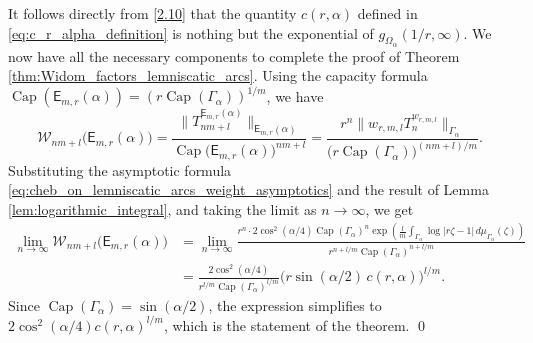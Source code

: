 \documentclass[12pt,oneside,reqno]{amsart}
\theoremstyle{definition}
\numberwithin{equation}{section}
\newcommand{\E}{{\mathsf E}}
\newcommand{\cW}{{\mathcal{W}}}
\renewcommand{\Cap}{\operatorname{Cap}}
\begin{document}
It follows directly from \eqref{2.10} that the quantity $c(r,\alpha)$ defined in \eqref{eq:c_r_alpha_definition} is nothing but the exponential of $g_{\Omega_\alpha}(1/r, \infty)$. 
We now have all the necessary components to complete the proof of Theorem \ref{thm:Widom_factors_lemniscatic_arcs}.
Using the capacity formula $\Cap(\E_{m,r}(\alpha)) = (r\Cap(\Gamma_\alpha))^{1/m}$, we have
\[
	\cW_{nm+l}\bigl(\E_{m,r}(\alpha)\bigr) = 
	\frac{\|T_{nm+l}^{\E_{m,r}(\alpha)}\|_{\E_{m,r}(\alpha)}}{\Cap\bigl(\E_{m,r}(\alpha)\bigr)^{nm+l}} = 
	\frac{r^n\|w_{r,m,l}T_{n}^{w_{r,m,l}}\|_{\Gamma_\alpha}}{\bigl(r\Cap(\Gamma_\alpha)\bigr)^{(nm+l)/m}}.
\]
Substituting the asymptotic formula \eqref{eq:cheb_on_lemniscatic_arcs_weight_asymptotics} and the result of Lemma \ref{lem:logarithmic_integral}, and taking the limit as $n\to\infty$, we get
\begin{align*}
\lim_{n\to\infty} \cW_{nm+l}\bigl(\E_{m,r}(\alpha)\bigr) &= \lim_{n\to\infty} \frac{r^n \cdot 2\cos^2(\alpha/4)\Cap(\Gamma_\alpha)^n \exp\left(\frac{l}{m}\int_{\Gamma_\alpha}\log|r\zeta-1|\,d\mu_{\Gamma_\alpha}(\zeta)\right)}{r^{n+l/m}\Cap(\Gamma_\alpha)^{n+l/m}} \\
&= \frac{2\cos^2(\alpha/4)}{r^{l/m}\Cap(\Gamma_\alpha)^{l/m}} \bigl( r \sin(\alpha/2)\,c(r,\alpha) \bigr)^{l/m}.
\end{align*}
Since $\Cap(\Gamma_\alpha) = \sin(\alpha/2)$, the expression simplifies to $2\cos^2(\alpha/4)c(r,\alpha)^{l/m}$,
which is the statement of the theorem. \qed
\end{document}
